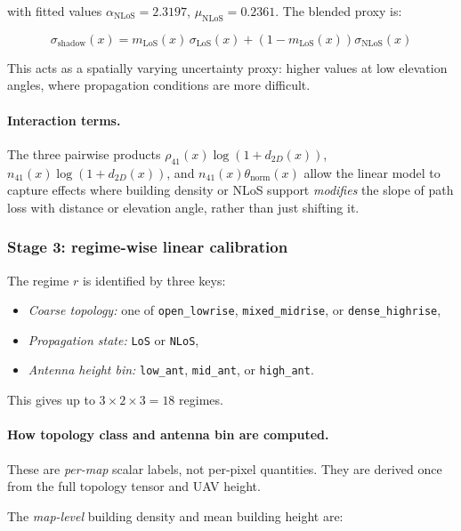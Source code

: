 \documentclass[11pt,a4paper]{article}
\begin{document}
with fitted values $\alpha_{\mathrm{NLoS}} = 2.3197$, $\mu_{\mathrm{NLoS}}
= 0.2361$. The blended proxy is:

\begin{equation}
\sigma_{\mathrm{shadow}}(x)=
m_{\mathrm{LoS}}(x)\,\sigma_{\mathrm{LoS}}(x)
+\left(1-m_{\mathrm{LoS}}(x)\right)\sigma_{\mathrm{NLoS}}(x)
\label{eq:sigma_blend}
\end{equation}

This acts as a spatially varying uncertainty proxy: higher values at low
elevation angles, where propagation conditions are more difficult.

\paragraph{Interaction terms.}
The three pairwise products
$\rho_{41}(x)\log(1+d_{2D}(x))$,
$n_{41}(x)\log(1+d_{2D}(x))$, and
$n_{41}(x)\theta_{\mathrm{norm}}(x)$
allow the linear model to capture effects where building density or NLoS
support \emph{modifies} the slope of path loss with distance or elevation
angle, rather than just shifting it.

\subsubsection{Stage 3: regime-wise linear calibration}

The regime $r$ is identified by three keys:
\begin{itemize}
\item \emph{Coarse topology:} one of \texttt{open\_lowrise},
      \texttt{mixed\_midrise}, or \texttt{dense\_highrise},
\item \emph{Propagation state:} \texttt{LoS} or \texttt{NLoS},
\item \emph{Antenna height bin:} \texttt{low\_ant}, \texttt{mid\_ant}, or
      \texttt{high\_ant}.
\end{itemize}
This gives up to $3 \times 2 \times 3 = 18$ regimes.

\paragraph{How topology class and antenna bin are computed.}
These are \emph{per-map} scalar labels, not per-pixel quantities.
They are derived once from the full topology tensor and UAV height.

The \emph{map-level} building density and mean building height are:
\end{document}
